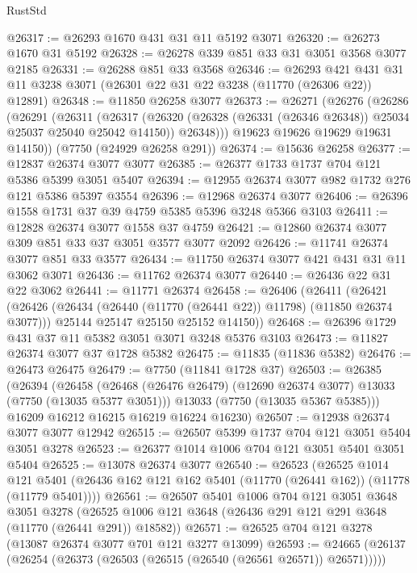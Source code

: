 \begin{lexlean}{RustStd}
\begin{coremodule}
@26317 := @26293 @1670 @431 @31 @11 @5192 @3071
@26320 := @26273 @1670 @31 @5192
@26328 := @26278 @339 @851 @33 @31 @3051 @3568 @3077 @2185
@26331 := @26288 @851 @33 @3568
@26346 := @26293
    @421
    @431
    @31
    @11
    @3238
    @3071
    (@26301 @22 @31 @22 @3238 (@11770 (@26306 @22)) @12891)
@26348 := @11850 @26258 @3077
@26373 := @26271
    (@26276
      (@26286
        (@26291
          (@26311
            (@26317
              (@26320 (@26328 (@26331 (@26346 @26348)) @25034 @25037 @25040 @25042 @14150))
              @26348)))
        @19623
        @19626
        @19629
        @19631
        @14150))
    (@7750 (@24929 @26258 @291))
@26374 := @15636 @26258
@26377 := @12837 @26374 @3077 @3077
@26385 := @26377 @1733 @1737 @704 @121 @5386 @5399 @3051 @5407
@26394 := @12955 @26374 @3077 @982 @1732 @276 @121 @5386 @5397 @3554
@26396 := @12968 @26374 @3077
@26406 := @26396 @1558 @1731 @37 @39 @4759 @5385 @5396 @3248 @5366 @3103
@26411 := @12828 @26374 @3077 @1558 @37 @4759
@26421 := @12860 @26374 @3077 @309 @851 @33 @37 @3051 @3577 @3077 @2092
@26426 := @11741 @26374 @3077 @851 @33 @3577
@26434 := @11750 @26374 @3077 @421 @431 @31 @11 @3062 @3071
@26436 := @11762 @26374 @3077
@26440 := @26436 @22 @31 @22 @3062
@26441 := @11771 @26374
@26458 := @26406
    (@26411
      (@26421
        (@26426 (@26434 (@26440 (@11770 (@26441 @22)) @11798) (@11850 @26374 @3077)))
        @25144
        @25147
        @25150
        @25152
        @14150))
@26468 := @26396 @1729 @431 @37 @11 @5382 @3051 @3071 @3248 @5376 @3103
@26473 := @11827 @26374 @3077 @37 @1728 @5382
@26475 := @11835 (@11836 @5382)
@26476 := @26473 @26475
@26479 := @7750 (@11841 @1728 @37)
@26503 := @26385
    (@26394
      (@26458
        (@26468 (@26476 @26479) (@12690 @26374 @3077) @13033 (@7750 (@13035 @5377 @3051)))
        @13033
        (@7750 (@13035 @5367 @5385)))
      @16209
      @16212
      @16215
      @16219
      @16224
      @16230)
@26507 := @12938 @26374 @3077 @3077 @12942
@26515 := @26507 @5399 @1737 @704 @121 @3051 @5404 @3051 @3278
@26523 := @26377 @1014 @1006 @704 @121 @3051 @5401 @3051 @5404
@26525 := @13078 @26374 @3077
@26540 := @26523
    (@26525
      @1014
      @121
      @5401
      (@26436 @162 @121 @162 @5401 (@11770 (@26441 @162)) (@11778 (@11779 @5401))))
@26561 := @26507
    @5401
    @1006
    @704
    @121
    @3051
    @3648
    @3051
    @3278
    (@26525 @1006 @121 @3648 (@26436 @291 @121 @291 @3648 (@11770 (@26441 @291)) @18582))
@26571 := @26525 @704 @121 @3278 (@13087 @26374 @3077 @701 @121 @3277 @13099)
@26593 := @24665
    (@26137 (@26254 (@26373 (@26503 (@26515 (@26540 (@26561 @26571)) @26571)))))

\end{coremodule}
\end{lexlean}
